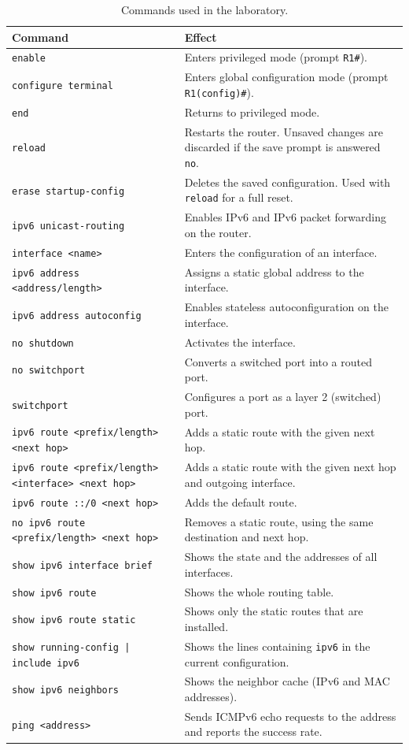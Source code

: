 \begin{table}[h]
\centering
\begin{tabular}{@{}p{6.6cm}p{8.6cm}@{}}
\toprule
\textbf{Command} & \textbf{Effect} \\
\midrule
\texttt{enable} & Enters privileged mode (prompt \texttt{R1\#}). \\
\texttt{configure terminal} & Enters global configuration mode (prompt \texttt{R1(config)\#}). \\
\texttt{end} & Returns to privileged mode. \\
\texttt{reload} & Restarts the router. Unsaved changes are discarded if the save prompt is answered \texttt{no}. \\
\texttt{erase startup-config} & Deletes the saved configuration. Used with \texttt{reload} for a full reset. \\
\texttt{ipv6 unicast-routing} & Enables IPv6 and IPv6 packet forwarding on the router. \\
\texttt{interface <name>} & Enters the configuration of an interface. \\
\texttt{ipv6 address <address/length>} & Assigns a static global address to the interface. \\
\texttt{ipv6 address autoconfig} & Enables stateless autoconfiguration on the interface. \\
\texttt{no shutdown} & Activates the interface. \\
\texttt{no switchport} & Converts a switched port into a routed port. \\
\texttt{switchport} & Configures a port as a layer 2 (switched) port. \\
\texttt{ipv6 route <prefix/length> <next hop>} & Adds a static route with the given next hop. \\
\texttt{ipv6 route <prefix/length> <interface> <next hop>} & Adds a static route with the given next hop and outgoing interface. \\
\texttt{ipv6 route ::/0 <next hop>} & Adds the default route. \\
\texttt{no ipv6 route <prefix/length> <next hop>} & Removes a static route, using the same destination and next hop. \\
\texttt{show ipv6 interface brief} & Shows the state and the addresses of all interfaces. \\
\texttt{show ipv6 route} & Shows the whole routing table. \\
\texttt{show ipv6 route static} & Shows only the static routes that are installed. \\
\texttt{show running-config | include ipv6} & Shows the lines containing \texttt{ipv6} in the current configuration. \\
\texttt{show ipv6 neighbors} & Shows the neighbor cache (IPv6 and MAC addresses). \\
\texttt{ping <address>} & Sends ICMPv6 echo requests to the address and reports the success rate. \\
\bottomrule
\end{tabular}
\caption{Commands used in the laboratory.}
\label{tab:lab01-commands}
\end{table}

